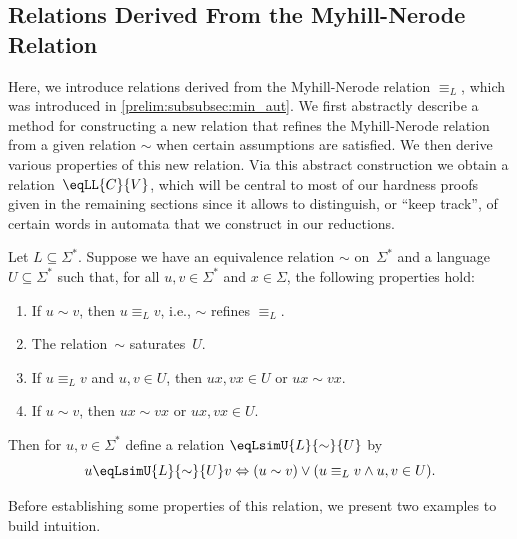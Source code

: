 \subsection{Relations Derived From the Myhill-Nerode Relation} 
\label{constrsync:sec:eqLn}

Here, we introduce relations derived from the Myhill-Nerode relation $\equiv_L$,
which was introduced in \cref{prelim:subsubsec:min_aut}. We first abstractly describe 
a method for constructing a new relation that refines the Myhill-Nerode relation from a given relation $\sim$ 
 when certain assumptions are satisfied.
We then derive various properties of this new relation.
Via this abstract construction we obtain a relation~$\eqLL{C}{V}$,
which will be central to most of our hardness proofs
given in the remaining sections since it allows 
to  distinguish, or ``keep track'', of certain words in automata that we construct in our reductions.

Let $L \subseteq \Sigma^*$. Suppose we have an equivalence
relation $\sim$ on~$\Sigma^*$ and a language $U \subseteq \Sigma^*$
such that, for all $u,v \in \Sigma^*$ and $x \in \Sigma$,
the following properties hold:
\begin{enumerate}
\item \label{constrsync:rel:refinesNerode} If $u \sim v$, then $u \equiv_L v$, i.e., $\sim$ refines $\equiv_L$.

\item \label{constrsync:rel:saturateU} The relation~$\sim$ saturates~$U$.

\item \label{constrsync:rel:right-congr2} If $u \equiv_L v$ and $u,v \in U$, then $ux,vx \in U$ or $ux \sim vx$.

\item \label{constrsync:rel:right-congr1} If $u \sim v$, then $ux \sim vx$ or $ux,vx \in U$.
\end{enumerate}
Then for $u,v \in \Sigma^*$ define a relation $\eqLsimU{L}{\sim}{U}$ by
\[
u \eqLsimU{L}{\sim}{U} v
\Leftrightarrow 
( u \sim v ) \lor ( u \equiv_L v \land u,v \in U ).
\]
\label{def:Nerode-generalization}

Before establishing some properties of this relation, we present two examples to build intuition.


